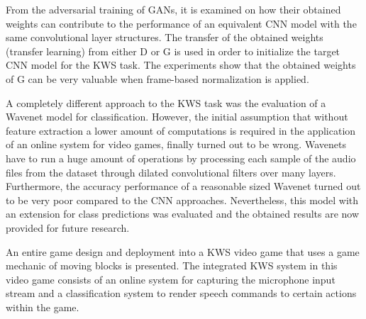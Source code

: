 From the adversarial training of GANs, it is examined on how their obtained weights can contribute to the performance of an equivalent CNN model with the same convolutional layer structures.
The transfer of the obtained weights (transfer learning) from either D or G is used in order to initialize the target CNN model for the KWS task.
The experiments show that the obtained weights of G can be very valuable when frame-based normalization is applied.

A completely different approach to the KWS task was the evaluation of a Wavenet \cite{Oord2016} model for classification.
However, the initial assumption that without feature extraction a lower amount of computations is required in the application of an online system for video games, finally turned out to be wrong.
Wavenets have to run a huge amount of operations by processing each sample of the audio files from the dataset through dilated convolutional filters over many layers.
Furthermore, the accuracy performance of a reasonable sized Wavenet turned out to be very poor compared to the CNN approaches.
Nevertheless, this model with an extension for class predictions was evaluated and the obtained results are now provided for future research.

An entire game design and deployment into a KWS video game that uses a game mechanic of moving blocks is presented.
The integrated KWS system in this video game consists of an online system for capturing the microphone input stream and a classification system to render speech commands to certain actions within the game.
